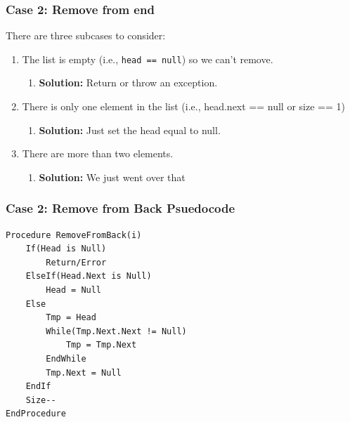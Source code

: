 \documentclass{beamer}
\begin{document}
\begin{frame}
    \frametitle{Case 2: Remove from end}
    There are three subcases to consider:
    \begin{enumerate}
        \item The list is empty (i.e., \lstinline|head == null|) so we can't remove.
        \begin{enumerate}
            \item \textbf{Solution: } Return or throw an exception.
        \end{enumerate}
        \item There is only one element in the list (i.e., head.next == null or size == 1)
        \begin{enumerate}
            \item \textbf{Solution: } Just set the head equal to null.
        \end{enumerate}
        \item There are more than two elements. 
        \begin{enumerate}
            \item \textbf{Solution: } We just went over that
        \end{enumerate}
    \end{enumerate}
\end{frame}


\begin{frame}[fragile]
    \frametitle{Case 2: Remove from Back Psuedocode}
    \begin{lstlisting}[frame=trBL]
Procedure RemoveFromBack(i)
    If(Head is Null)
        Return/Error
    ElseIf(Head.Next is Null)
        Head = Null
    Else
        Tmp = Head
        While(Tmp.Next.Next != Null)
            Tmp = Tmp.Next
        EndWhile
        Tmp.Next = Null
    EndIf
    Size--
EndProcedure
    \end{lstlisting}
\end{frame}
\end{document}

